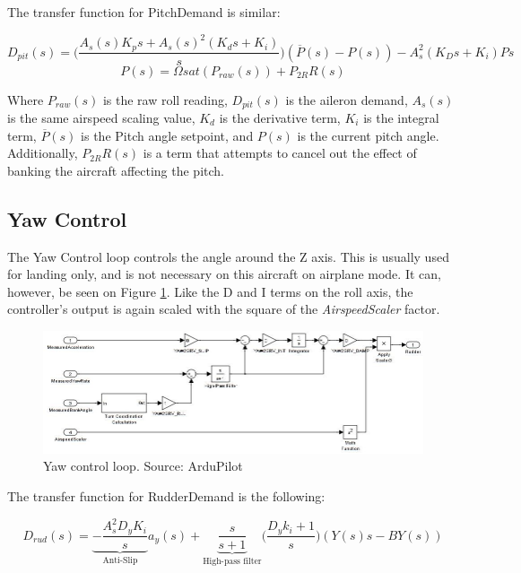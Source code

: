 The transfer function for PitchDemand is similar:

\begin{equation}
D_{pit}(s) = \bigg(\frac{A_s(s) K_p s + A_s(s)^2(K_d s + K_i)}{s}\bigg)(\overline{P}(s) - P(s)) - A_s^2(K_D s + K_i)Ps
\end{equation}
\begin{equation}
P(s) = \Omega sat(P_{raw}(s)) + P_{2R}R(s)
\end{equation}

Where $P_{raw}(s)$ is the raw roll reading, $D_{pit}(s)$ is the aileron demand, $A_s(s)$ is the same airspeed scaling value, $K_d$ is the derivative term, $K_i$ is the integral term, $\overline{P}(s)$ is the Pitch angle setpoint, and $P(s)$ is the current pitch angle. Additionally, $P_{2R}R(s)$ is a term that attempts to cancel out the effect of banking the aircraft affecting the pitch.



\subsection{Yaw Control}
The Yaw Control loop controls the angle around the Z axis. This is usually used for landing only, and is not necessary on this aircraft on airplane mode. It can, however, be seen on Figure \ref{fig:yaw_loop}.
Like the D and I terms on the roll axis, the controller's output is again scaled with the square of the \textit{AirspeedScaler} factor.

\begin{figure}[H]
\centering
  \includegraphics[width=\linewidth]{figs/yaw_control_loop.jpg}
  \caption{Yaw control loop. Source: ArduPilot}
  \label{fig:yaw_loop}
\end{figure}

The transfer function for RudderDemand is the following:

\begin{equation}
D_{rud}(s) = \underbrace{ - \frac{A_s^2 D_y K_i}{s}}_\text{Anti-Slip} a_y(s) + \underbrace{\frac{s}{s+1}}_\text{High-pass filter}\bigg(\frac{D_y k_i + 1}{s}\bigg)(Y(s)s-BY(s))
\end{equation}

